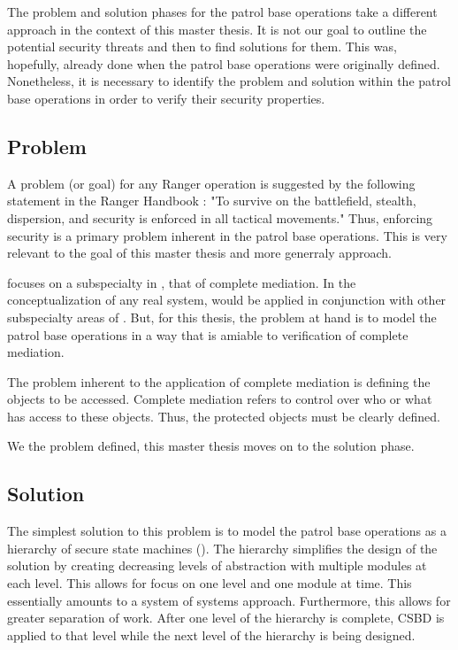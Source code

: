 \documentclass[../../main/main.tex]{subfiles}
\begin{document}
The problem and solution phases for the patrol base operations take a different approach in the context of this master thesis. It is not our goal to outline the potential security threats and then to find solutions for them.  This was, hopefully, already done when the patrol base operations were originally defined.  Nonetheless, it is necessary to identify the problem and solution within the patrol base operations in order to verify their security properties.  


\subsection{Problem}
A problem (or goal) for any Ranger operation is suggested by the following statement in the Ranger Handbook  \cite{rangermanual}: "To survive on the battlefield, stealth, dispersion, and security is enforced in all tactical movements." Thus, enforcing security is a primary problem inherent in the patrol base operations.  This is very relevant to the goal of this master thesis and more generraly  approach.  

 focuses on a subspecialty in , that of complete mediation.  In the conceptualization of any real system,  would be applied in conjunction with other subspecialty areas of .  But, for this thesis, the problem at hand is to model the patrol base operations in a way that is amiable to verification of complete mediation.

The problem inherent to the application of complete mediation is defining the objects to be accessed.  Complete mediation refers to control over who or what has access to these objects.  Thus, the protected objects must be clearly defined.

We the problem defined, this master thesis moves on to the solution phase.



\subsection{Solution}
The simplest solution to this problem is to model the patrol base operations as a hierarchy of secure state machines ().  The hierarchy simplifies the design of the solution by creating decreasing levels of abstraction with multiple modules at each level.  This allows for focus on one level and one module at time. This essentially amounts to a system of systems approach.  Furthermore, this allows for greater separation of work.  After one level of the hierarchy is complete, CSBD is applied to that level while the next level of the hierarchy is being designed.
\end{document}

